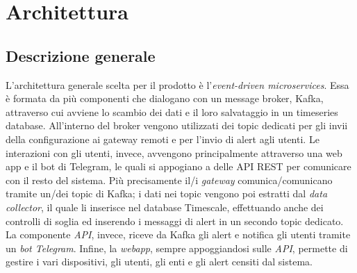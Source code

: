 \section{Architettura} 
	\subsection{Descrizione generale}
		L'architettura generale scelta per il prodotto è l'\textit{event-driven microservices}. 
		Essa è formata da più componenti che dialogano con un message broker, Kafka, attraverso cui avviene lo scambio dei dati e il loro salvataggio in un timeseries database.
		\newline
		All'interno del broker vengono utilizzati dei topic dedicati per gli invii della configurazione ai gateway remoti e per l'invio di alert agli utenti. 
		\newline
		Le interazioni con gli utenti, invece, avvengono principalmente attraverso una web app e il bot di Telegram, le quali si appogiano a delle API REST per comunicare con il resto del sistema.
		\newline
		\newline
		Più precisamente il/i \textit{gateway} comunica/comunicano tramite un/dei topic di Kafka; i dati nei topic vengono poi estratti dal \textit{data collector}, il quale li inserisce nel database Timescale,  effettuando anche dei controlli di soglia ed inserendo i messaggi di alert in un secondo topic dedicato.
		\newline
		La componente \textit{API}, invece, riceve da Kafka gli alert e notifica gli utenti tramite un \textit{bot Telegram}.
		\newline
		Infine, la \textit{webapp}, sempre appoggiandosi sulle \textit{API}, permette di gestire i vari dispositivi, gli utenti, gli enti e gli alert censiti dal sistema.

